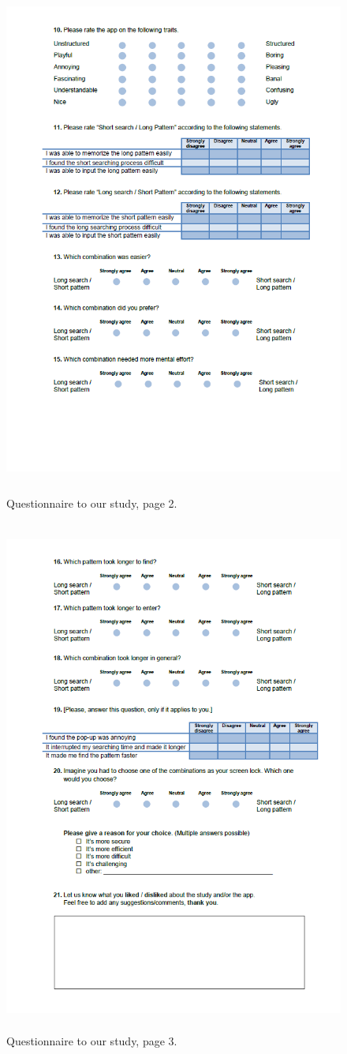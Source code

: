 \begin{figure}[H]
\includegraphics[width=13cm, height=17cm]{Chapters/graphics/survey2.PNG}
\caption{Questionnaire to our study, page 2.}
\label{fig:survey2}
\end{figure}

\begin{figure}[H]
\includegraphics[width=13cm, height=17cm]{Chapters/graphics/survey3.PNG}
\caption{Questionnaire to our study, page 3.}
\label{fig:survey3}
\end{figure}



